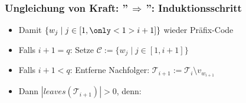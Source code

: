 \documentclass{beamer}
\begin{document}
\begin{frame}[t]
    \frametitle{Ungleichung von Kraft: ''$\,\Longrightarrow\,$'': Induktionsschritt}
    \begin{itemize}
        \setlength\itemsep{1em}
        \item Damit $\{w_j \mid j \in [1,{\only<1>{\color{blue}}i+1}]\}$ wieder Präfix-Code
        \item Falls $i+1 = q$: Setze $\mathcal{C} := \{w_j \mid j \in [1,i+1]\}$
        \pause
        \item Falls $i+1 < q$: Entferne Nachfolger: $\mathcal{T}_{i+1} := \mathcal{T}_i \setminus v_{w_{i+1}}$
        \pause
        \item Dann $|leaves(\mathcal{T}_{i+1})| > 0$, denn:
    \end{itemize}
    \strut
\end{frame}
\end{document}
